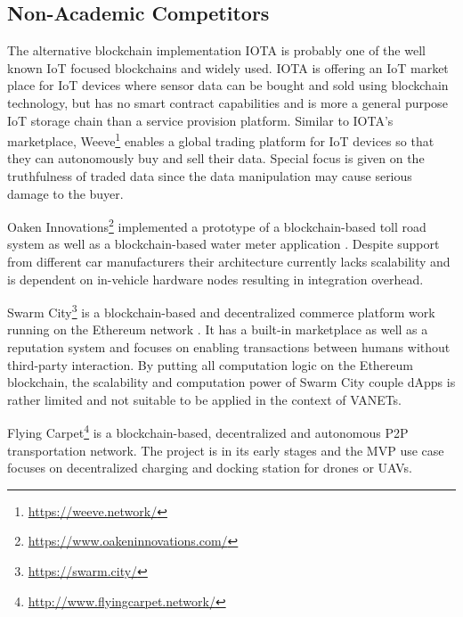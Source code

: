 \documentclass{llncs}
\begin{document}
{		%
			
		\subsection{Non-Academic Competitors}
			\label{sss:non-academic-competitors}

			The alternative blockchain implementation IOTA \cite{iotaWhitepaper} is probably one of the well known IoT focused blockchains and widely used. IOTA is offering an IoT market place \cite{iotaMarketplace} for IoT devices where sensor data can be bought and sold using blockchain technology, but has no smart contract capabilities and is more a general purpose IoT storage chain than a service provision platform. Similar to IOTA's marketplace, Weeve\footnote{\url{https://weeve.network/}} \cite{weeveWhitepaper} enables a global trading platform for IoT devices so that they can autonomously buy and sell their data. Special focus is given on the truthfulness of traded data since the data manipulation may cause serious damage to the buyer.
			
			Oaken Innovations\footnote{\url{https://www.oakeninnovations.com/}} implemented a prototype of a blockchain-based toll road system \cite{oakenTeslaTollbooth} as well as a blockchain-based water meter application \cite{oakenWaterMeter}. Despite support from different car manufacturers their architecture currently lacks scalability and is dependent on in-vehicle hardware nodes resulting in integration overhead. 
			
			Swarm City\footnote{\url{https://swarm.city/}} is a blockchain-based and decentralized commerce platform work running on the Ethereum network \cite{swarmWhitepaper1}\cite{swarmWhitepaper2}. It has a built-in marketplace as well as a reputation system and focuses on enabling transactions between humans without third-party interaction. By putting all computation logic on the Ethereum blockchain, the scalability and computation power of Swarm City couple dApps is rather limited and not suitable to be applied in the context of VANETs.

			Flying Carpet\footnote{\url{http://www.flyingcarpet.network/}} is a blockchain-based, decentralized and autonomous P2P transportation network. The project is in its early stages and the MVP use case focuses on decentralized charging and docking station for drones or UAVs.

}
\end{document}
